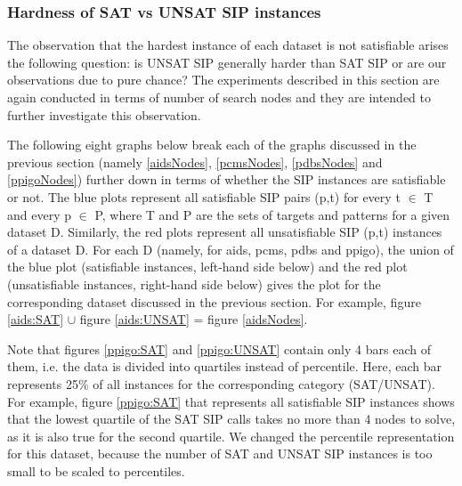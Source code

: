 \documentclass{l4proj}
\newcounter{example}[section]
\begin{document}
\subsubsection{Hardness of SAT vs UNSAT SIP instances}

The observation that the hardest instance of each dataset is not satisfiable arises the following question: is UNSAT SIP generally harder than SAT SIP or are our observations due to pure chance? The experiments described in this section are again conducted in terms of number of search nodes and they are intended to further investigate this observation.

The following eight graphs below break each of the graphs discussed in the previous section (namely \ref{aidsNodes}, \ref{pcmsNodes}, \ref{pdbsNodes} and \ref{ppigoNodes}) further down in terms of whether the SIP instances are satisfiable or not. The blue plots represent all satisfiable SIP pairs (p,t) for every t $\in$ T and every p $\in$ P, where T and P are the sets of targets and patterns for a given dataset D. Similarly, the red plots represent all unsatisfiable SIP (p,t) instances of a dataset D. For each D (namely, for aids, pcms, pdbs and ppigo), the union of the blue plot (satisfiable instances, left-hand side below) and the red plot (unsatisfiable instances, right-hand side below) gives the plot for the corresponding dataset discussed in the previous section. For example, figure \ref{aids:SAT} $\cup$ figure \ref{aids:UNSAT} = figure \ref{aidsNodes}.

Note that figures \ref{ppigo:SAT} and \ref{ppigo:UNSAT} contain only 4 bars each of them, i.e. the data is divided into quartiles instead of percentile. Here, each bar represents 25\% of all instances for the corresponding category (SAT/UNSAT). For example, figure \ref{ppigo:SAT} that represents all satisfiable SIP instances shows that the lowest quartile of the SAT SIP calls takes no more than 4 nodes to solve, as it is also true for the second quartile. We changed the percentile representation for this dataset, because the number of SAT and UNSAT SIP instances is too small to be scaled to percentiles.

\end{document}
